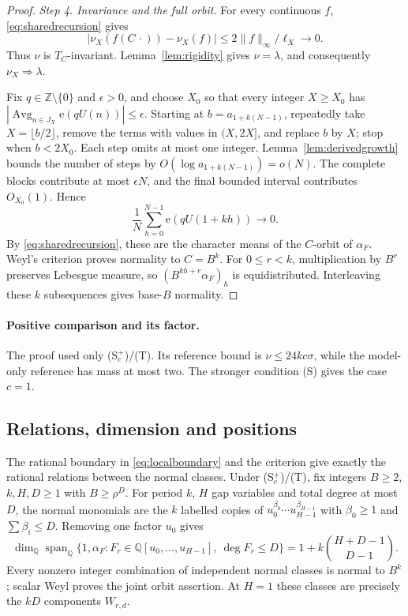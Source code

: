 \documentclass[11pt,a4paper]{article}
\newcommand{\e}{\mathrm e}
\newcommand{\Z}{\mathbb Z}
\newcommand{\Q}{\mathbb Q}
\DeclareMathOperator{\Avg}{Avg}
\begin{document}
\begin{proof}
\smallskip\noindent\emph{Step 4. Invariance and the full orbit.}
For every continuous $f$, \eqref{eq:sharedrecursion} gives
\[
 |\nu_X(f(C\,\cdot))-\nu_X(f)|
                    \le2\|f\|_\infty/\ell_X\longrightarrow0.
\]
Thus $\nu$ is $T_C$-invariant. Lemma~\ref{lem:rigidity} gives
$\nu=\lambda$, and consequently $\nu_X\Rightarrow\lambda$.

Fix $q\in\Z\setminus\{0\}$ and $\epsilon>0$, and choose $X_0$ so that
every integer $X\ge X_0$ has
$|\Avg_{n\in J_X}\e(qU(n))|\le\epsilon$.
Starting at $b=a_{1+k(N-1)}$, repeatedly take $X=\lfloor b/2\rfloor$,
remove the terms with values in $(X,2X]$, and replace $b$ by $X$;
stop when $b<2X_0$.
Each step omits at most one integer. Lemma~\ref{lem:derivedgrowth}
bounds the number of steps by $O(\log a_{1+k(N-1)})=o(N)$.
The complete blocks contribute at most $\epsilon N$, and the final
bounded interval contributes $O_{X_0}(1)$. Hence
\[
 \frac1N\sum_{h=0}^{N-1}\e(qU(1+kh))\longrightarrow0.
\]
By \eqref{eq:sharedrecursion}, these are the character means of the
$C$-orbit of $\alpha_F$. Weyl's criterion proves normality to $C=B^k$.
For $0\le r<k$, multiplication by $B^r$ preserves Lebesgue measure,
so $(B^{kh+r}\alpha_F)_h$ is equidistributed. Interleaving these
$k$ subsequences gives base-$B$ normality.
\end{proof}

\paragraph{Positive comparison and its factor.}
The proof used only (S$^+_c$)/(T). Its reference bound is
$\nu\le24kc\sigma$, while the model-only reference has mass at most two.
The stronger condition (S) gives the case $c=1$.

\subsection[Relations and positions]{Relations, dimension and positions}\label{sec:consequences}

The rational boundary in \eqref{eq:localboundary} and the criterion
give exactly the rational relations between the normal classes.
Under (S$^+_c$)/(T), fix integers $B\ge2$, $k,H,D\ge1$ with $B\ge\rho^D$.
For period $k$, $H$ gap variables and total degree at most $D$,
the normal monomials are the $k$ labelled copies of
$u_0^{\beta_0}\cdots u_{H-1}^{\beta_{H-1}}$ with $\beta_0\ge1$
and $\sum\beta_i\le D$. Removing one factor $u_0$ gives
\[
 \dim_\Q\operatorname{span}_\Q
 \{1,\alpha_F:F_r\in\Q[u_0,\ldots,u_{H-1}],\ \deg F_r\le D\}
      =1+k\binom{H+D-1}{D-1}.
\]
Every nonzero integer combination of independent normal classes is
normal to $B^k$; scalar Weyl proves the joint orbit assertion.
At $H=1$ these classes are precisely the $kD$ components $W_{r,d}$.
\end{document}
